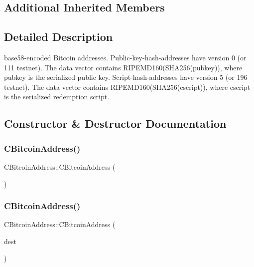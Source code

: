 \subsection*{Additional Inherited Members}


\subsection{Detailed Description}
base58-\/encoded Bitcoin addresses. Public-\/key-\/hash-\/addresses have version 0 (or 111 testnet). The data vector contains R\+I\+P\+E\+M\+D160(\+S\+H\+A256(pubkey)), where pubkey is the serialized public key. Script-\/hash-\/addresses have version 5 (or 196 testnet). The data vector contains R\+I\+P\+E\+M\+D160(\+S\+H\+A256(cscript)), where cscript is the serialized redemption script. 

\subsection{Constructor \& Destructor Documentation}
\mbox{\label{class_c_bitcoin_address_ae1870e2f346a1f9968a201864fbdf010}} 
\subsubsection{\texorpdfstring{C\+Bitcoin\+Address()}{CBitcoinAddress()}\hspace{0.1cm}{\footnotesize\ttfamily [1/4]}}
{\footnotesize\ttfamily C\+Bitcoin\+Address\+::\+C\+Bitcoin\+Address (\begin{DoxyParamCaption}{ }\end{DoxyParamCaption})\hspace{0.3cm}{\ttfamily [inline]}}

\mbox{\label{class_c_bitcoin_address_a4c9c03791561557b8a1926567456712e}} 
\subsubsection{\texorpdfstring{C\+Bitcoin\+Address()}{CBitcoinAddress()}\hspace{0.1cm}{\footnotesize\ttfamily [2/4]}}
{\footnotesize\ttfamily C\+Bitcoin\+Address\+::\+C\+Bitcoin\+Address (\begin{DoxyParamCaption}\item[{const C\+Tx\+Destination \&}]{dest }\end{DoxyParamCaption})\hspace{0.3cm}{\ttfamily [inline]}}

